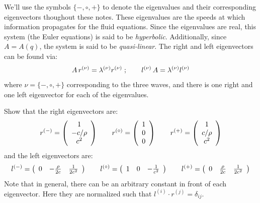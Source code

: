 We'll use the symbols $\{-,\circ,+\}$ to denote the eigenvalues and their
corresponding eigenvectors thoughout these notes.
These eigenvalues are the speeds at which information propagates for the
fluid equations.
Since the eigenvalues are real, this system (the Euler equations) is said
to be {\em hyperbolic}.  Additionally, since $A = A(q)$, the system is
said to be {\em quasi-linear}.  
%
The right and left eigenvectors can be found via:
\begin{equation}
A \, r^{(\nu)} = \lambda^{(\nu)} r^{(\nu)} \; ;
\qquad
l^{(\nu)} \, A  = \lambda^{(\nu)} l^{(\nu)}
\end{equation}
where $\nu = \{-,\circ,+\}$ corresponding to the three waves, and 
there is one right and one left eigenvector for each of the eigenvalues.
%
\begin{exercise}
{
Show that the right eigenvectors are:
\begin{equation}
r^\evm = \left ( \begin{array}{c} 1 \\ -c/\rho \\ c^2 \end{array} \right )
%
\qquad
r^\evz = \left ( \begin{array}{c} 1 \\ 0 \\ 0  \end{array} \right )
%
\qquad
r^\evp = \left ( \begin{array}{c} 1 \\ c/\rho \\ c^2 \end{array} \right )
\end{equation}
and the left eigenvectors are:
\begin{equation}
l^\evm = \left ( \begin{array}{ccc} 0 & -\frac{\rho}{2c} & \frac{1}{2c^2} 
                  \end{array} \right )
%
\qquad
l^\evz = \left ( \begin{array}{ccc} 1 & 0 & -\frac{1}{c^2}  \end{array} \right )
%
\qquad
l^\evp = \left ( \begin{array}{ccc} 0 & \frac{\rho}{2c} & \frac{1}{2c^2} \end{array} \right )
\end{equation}
Note that in general, there can be an arbitrary constant in front of each
eigenvector.  Here they are normalized such that 
$l^{(i)} \cdot r^{(j)} = \delta_{ij}$.
}
\end{exercise}

